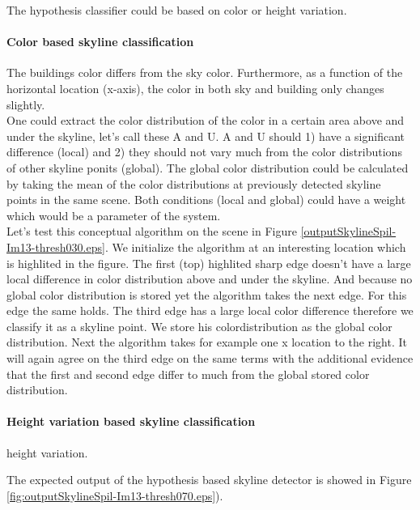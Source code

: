 The hypothesis classifier could be based on color or height variation.

\paragraph{Color based skyline classification}
The buildings color differs from the sky color. Furthermore,
as a function of the horizontal location (x-axis), the color in both sky and
building only changes slightly.\\
One could extract the color distribution of the color in a certain area above
and under the skyline, let's call these A and U. 
A and U should 1) have a significant difference (local) and 2) they should not vary much from 
the color distributions of other skyline ponits (global).
The global color distribution could be calculated by taking the mean of the color
distributions at previously detected skyline points in the same scene.
Both conditions (local and global) could have a weight 
which would be a parameter of the system.\\

Let's test this conceptual algorithm on the scene in Figure
\ref{outputSkylineSpil-Im13-thresh030.eps}.
We initialize the algorithm at an interesting location which is highlited in the
figure.  The first (top) highlited sharp edge doesn't have a large local difference in color distribution
above and under the skyline. And because no global color distribution is stored yet
the algorithm takes the next edge. For this edge the same holds.
The third edge has a large local color difference therefore we classify it as
a skyline point. We store his colordistribution as the global color
distribution. Next the algorithm takes for example one x location to the right.
It will again agree on the third edge on the same terms with the additional evidence that the
first and second edge differ to much from the global stored color distribution. 

\paragraph{Height variation based skyline classification}
height variation.


The expected output of the hypothesis based skyline detector is showed in Figure \ref{fig:outputSkylineSpil-Im13-thresh070.eps}). 

